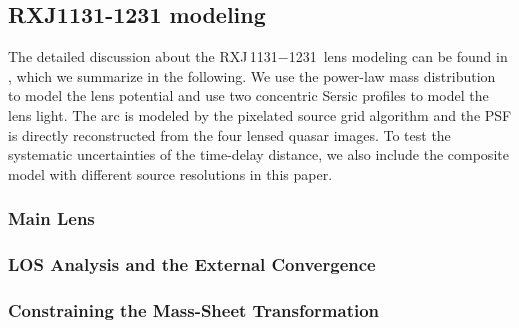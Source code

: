 \documentclass[useAMS,usenatbib]{mnras}
\newcommand\todo[1]{\textcolor{red}{#1}}
\newcommand\rxj{RXJ\,1131$-$1231}
\begin{document}
\subsection{RXJ1131-1231 modeling}
\label{subsec:RXJmodeling}
The detailed discussion about the \rxj~lens modeling can be found in \citet{GChenEtal16}, which we summarize in the following. We use the power-law mass distribution to model the lens potential and use two concentric S$\acute{\text{e}}$rsic profiles to model the lens light. The arc is modeled by the pixelated source grid algorithm and the PSF is directly reconstructed from the four lensed quasar images.
To test the systematic uncertainties of the time-delay distance, we also include the composite model with different source resolutions in this paper.

\subsubsection{Main Lens}

\subsubsection{LOS Analysis and the External Convergence}

\subsubsection{Constraining the Mass-Sheet Transformation}
\end{document}
